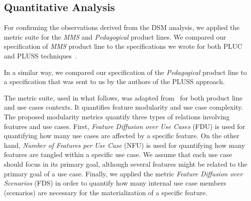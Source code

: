 \documentclass{acm_proc_article-sp}
\begin{document}
% 




\subsection{Quantitative Analysis}

For confirming the observations derived from the DSM analysis, we applied the
metric suite for the \emph{MMS} and \emph{Pedagogical} product lines. We compared
our specification of \emph{MMS} product line to the specifications we wrote for
both PLUC and PLUSS techniques~\cite{spg-url}.

In a similar way, we compared our specification of the \emph{Pedagogical} product line 
to a specification that was sent to us by the authors of the PLUSS approach. 

The metric suite, used in what follows, was adapted from~\cite{garcia-taosd-2005} for both product line 
and use cases contexts. It quantifies 
feature modularity and use case complexity. The proposed modularity 
metrics quantify three types of relations involving features and use cases.
First, \emph{Feature Diffusion over Use Cases} (FDU) is used for
quantifying how many use cases are affected by a specific
feature. On the other hand, \emph{Number of Features per Use Case} (NFU) is used for quantifying
how many features are tangled within a specific use
case. We assume that each use case should focus in
its primary goal, although several features might be related
to the primary goal of a use case. Finally, we applied
the metric \emph{Feature Diffusion over Scenarios} (FDS) in order
to quantify how many internal use case members (scenarios)
are necessary for the materialization of a specific feature.
 
\end{document}
